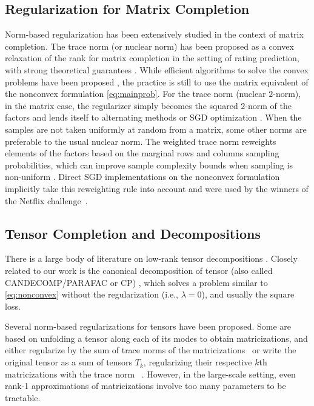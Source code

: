 \documentclass{article}
\newcommand{\CP}{{CP}\xspace}
\begin{document}
\subsection{Regularization for Matrix Completion}
\label{sec:matNorm}
Norm-based regularization has been extensively studied in the context
of matrix completion. The trace norm (or nuclear norm) has been
proposed as a convex relaxation of the rank
\citep{srebro_maximum-margin_2005} for matrix completion in the
setting of rating prediction, with strong theoretical guarantees
\citep{candes_exact_2009}. While efficient algorithms to solve the
convex problems have been proposed 
\citep[see e.g.][]{cai_singular_2010,jaggi_simple_2010}, the practice is still to
use the matrix equivalent of the nonconvex formulation
\eqref{eq:mainprob}. For the trace norm (nuclear $2$-norm), in the
matrix case, the regularizer simply becomes the squared $2$-norm of the factors and lends itself to alternating methods or SGD optimization
\citep{rennie_fast_2005,koren_matrix_2009}. When the samples are not
taken uniformly at random from a matrix, some other norms are
preferable to the usual nuclear norm. The weighted trace norm
reweights elements of the factors based on the marginal rows and columns sampling probabilities, which can improve sample complexity bounds when sampling is non-uniform  \citep{foygel_learning_2011,negahban_restricted_2012}. Direct SGD
implementations on the nonconvex formulation implicitly take this reweighting rule into account and were used by the winners of the Netflix challenge~\citep[see][Section 5]{srebro_collaborative_2010}.


\subsection{Tensor Completion and Decompositions}
There is a large body of literature on low-rank tensor decompositions
\citep[see][for a comprehensive review]{kolda_tensor_2009}. Closely
related to our work is the canonical decomposition of tensor (also
called CANDECOMP/PARAFAC or \CP) \citep{hitchcock_expression_1927},
which solves a problem similar to \eqref{eq:nonconvex} without the
regularization (i.e., $\lambda=0$), and usually the square
loss.

Several norm-based regularizations for tensors have been proposed. Some are based on unfolding a tensor along each of its modes to obtain matricizations, and either regularize by the sum of trace norms of the matricizations~\citep{tomioka_estimation_2010} or write the original tensor
as a sum of tensors $T_k$, regularizing their respective $k$th matricizations with the trace norm ~\citep{wimalawarne_multitask_2014}. However, in the large-scale setting, even rank-1 approximations of matricizations involve too many parameters to be tractable.
\end{document}
